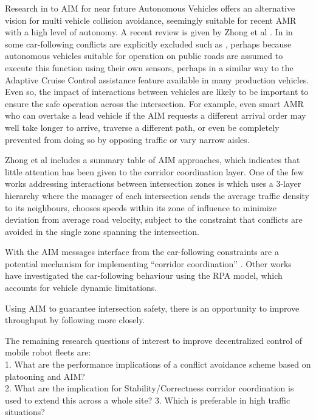 \documentclass[runningheads]{llncs}
\begin{document}
Research in to AIM for near future Autonomous Vehicles offers an alternative vision for multi vehicle collision avoidance, seemingly suitable for recent AMR with a high level of autonomy. A recent review is given by Zhong et al \cite{Zhong2020}. In in some car-following conflicts are explicitly excluded such as \cite{Yao2020}, perhaps because autonomous vehicles suitable for operation on public roads are assumed to execute this function using their own sensors, perhaps in a similar way to the Adaptive Cruise Control assistance feature available in many production vehicles. Even so, the impact of interactions between vehicles are likely to be important to ensure the safe operation across the intersection. For example, even smart AMR who can overtake a lead vehicle if the AIM requests a different arrival order may well take longer to arrive, traverse a different path, or even be completely prevented from doing so by opposing traffic or vary narrow aisles. 

Zhong et al \cite{Zhong2020} includes a summary table of AIM approaches, which indicates that little attention has been given to the corridor coordination layer.  One of the few works addressing interactions between intersection zones is \cite{Du2018} which uses a 3-layer hierarchy where the manager of each intersection sends the average traffic density to its neighbours, chooses speeds within its zone of influence to minimize deviation from average road velocity, subject to the constraint that conflicts are avoided in the single zone spanning the intersection. 

With the AIM messages interface from \cite{Levin2017} the car-following constraints are a potential mechanism for implementing ``corridor coordination'' . Other works have investigated the car-following behaviour \cite{Bichiou2019} using the RPA model, which accounts for vehicle dynamic limitations. 



Using AIM to guarantee intersection safety, there is an opportunity to improve throughput by following more closely. 
 
The remaining research questions of interest to improve decentralized control of mobile robot fleets are:\\
1.  What are the performance implications of a conflict avoidance scheme based on platooning and AIM? \\
2. What are the implication for Stability/Correctness corridor coordination is used to extend this across a whole site?
3.  Which is preferable in high traffic situations?\\
\end{document}
